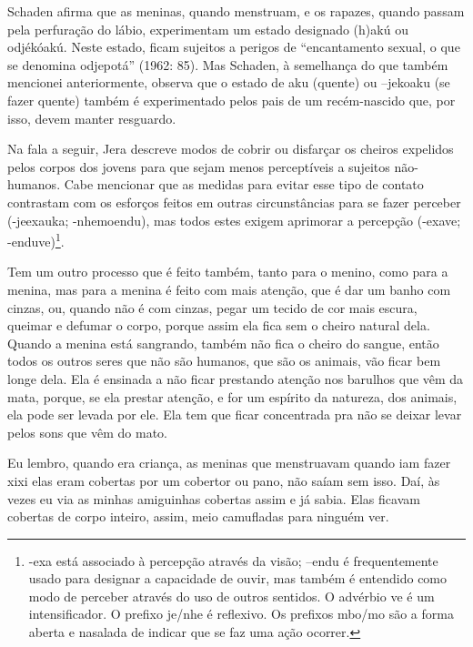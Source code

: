 \documentclass{article}
\begin{document}
Schaden afirma que as meninas, quando menstruam, e os rapazes, quando
passam pela perfura\c{c}\~ao do l\'abio, experimentam um estado
designado (h)ak\'u ou odj\'ek\'oak\'u. Neste estado, ficam sujeitos a
perigos de {\textquotedblleft}encantamento sexual, o que se denomina
odjepot\'a{\textquotedblright} (1962: 85). Mas Schaden, \`a
semelhan\c{c}a do que tamb\'em mencionei anteriormente, observa que o
estado de aku (quente) ou {}--jekoaku (se fazer quente) tamb\'em \'e
experimentado pelos pais de um rec\'em-nascido que, por isso, devem
manter resguardo. 

Na fala a seguir, Jera descreve modos de cobrir ou disfar\c{c}ar os
cheiros expelidos pelos corpos dos jovens para que sejam menos
percept\'iveis a sujeitos n\~ao-humanos. Cabe mencionar que as medidas
para evitar esse tipo de contato contrastam com os esfor\c{c}os feitos
em outras circunst\^ancias para se fazer perceber (-jeexauka;
-nhemoendu), mas todos estes exigem aprimorar a percep\c{c}\~ao
(-exave; -enduve)\footnote{ {}-exa est\'a associado \`a percep\c{c}\~ao
atrav\'es da vis\~ao; --endu \'e frequentemente usado para designar a
capacidade de ouvir, mas tamb\'em \'e entendido como modo de perceber
atrav\'es do uso de outros sentidos. O adv\'erbio ve \'e um
intensificador. O prefixo je/nhe \'e reflexivo. Os prefixos mbo/mo
s\~ao a forma aberta e nasalada de indicar que se faz uma a\c{c}\~ao
ocorrer. }. 

Tem um outro processo que \'e feito tamb\'em, tanto para o menino, como
para a menina, mas para a menina \'e feito com mais aten\c{c}\~ao, que
\'e dar um banho com cinzas, ou, quando n\~ao \'e com cinzas, pegar um
tecido de cor mais escura, queimar e defumar o corpo, porque assim ela
fica sem o cheiro natural dela. Quando a menina est\'a sangrando,
tamb\'em n\~ao fica o cheiro do sangue, ent\~ao todos os outros seres
que n\~ao s\~ao humanos, que s\~ao os animais, v\~ao ficar bem longe
dela. Ela \'e ensinada a n\~ao ficar prestando aten\c{c}\~ao nos
barulhos que v\^em da mata, porque, se ela prestar aten\c{c}\~ao, e for
um esp\'irito da natureza, dos animais, ela pode ser levada por ele.
Ela tem que ficar concentrada pra n\~ao se deixar levar pelos sons que
v\^em do mato.

Eu lembro, quando era crian\c{c}a, as meninas que menstruavam quando iam
fazer xixi elas eram cobertas por um cobertor ou pano, n\~ao sa\'iam
sem isso. Da\'i, \`as vezes eu via as minhas amiguinhas cobertas assim
e j\'a sabia. Elas ficavam cobertas de corpo inteiro, assim, meio
camufladas para ningu\'em ver.
\end{document}
